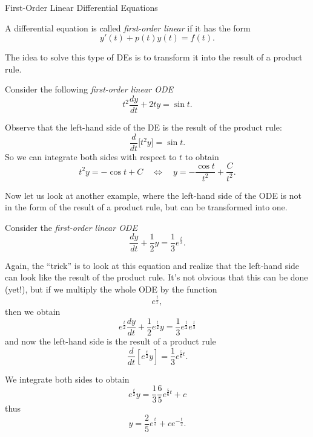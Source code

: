 \newpage

\begin{submodule}{First-Order Linear Differential Equations}

\begin{definition}
A differential equation is called \emph{first-order linear} if it has the form
$$
y'(t) + p(t) y(t) = f(t).
$$
\end{definition}


The idea to solve this type of DEs is to transform it into the result of a product rule. \\


\begin{example}
Consider the following \emph{first-order linear ODE}
$$
t^2 \frac{dy}{dt} + 2t y = \sin t.
$$

Observe that the left-hand side of the DE is the result of the product rule:
$$
\frac{d}{dt} \bigg[ t^2 y \bigg] = \sin t.
$$
So  we can integrate both sides with respect to $t$ to obtain
$$
t^2 y = - \cos t + C 
\quad \Leftrightarrow \quad y = -\frac{\cos t}{t^2} + \frac{C}{t^2}.
$$
\end{example}


Now let us look at another example, where the left-hand side of the ODE is not in the form of the result of a product rule, but can be transformed into one.


\begin{example}
Consider the \emph{first-order linear ODE}
\begin{equation}\tag{$\star$}\label{eq:intfact_1}
\frac{dy}{dt} + \frac12 y = \frac13 e^{\frac t3}.
\end{equation}


Again, the ``trick'' is to look at this equation and realize that the left-hand side can look like the result of the product rule.
It's not obvious that this can be done (yet!), but if we multiply the whole ODE by the function
$$
e^{\frac{t}{2}},
$$
then we obtain
$$
e^{\frac t2} \frac{dy}{dt} + \frac12e^{\frac t2} y = \frac13 e^{\frac t2} e^{\frac t3}
$$
and now the left-hand side is the result of a product rule
$$
\frac{d}{dt}\left[e^{\frac t2} y \right] = \frac13e^{\frac 56 t}.
$$

We integrate both sides to obtain
$$
e^{\frac t2} y = \frac13 \frac65 e^{\frac56 t} + c
$$
thus
$$
y %
	= \frac25 e^{\frac t3} + c e^{-\frac t2}.
$$


\end{example}
\end{submodule}
